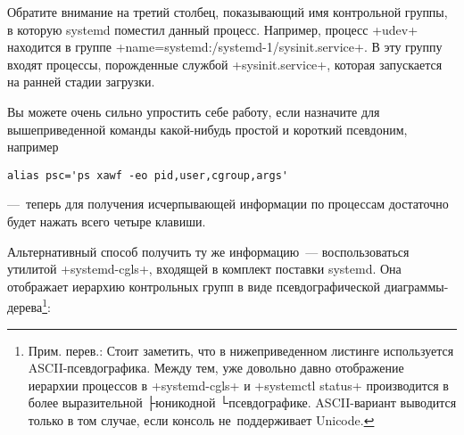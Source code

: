 \documentclass[10pt,oneside,a4paper]{article}
\begin{document}
Обратите внимание на третий столбец, показывающий имя контрольной группы,
в которую systemd поместил данный процесс. Например, процесс +udev+
находится в группе +name=systemd:/systemd-1/sysinit.service+. В эту группу
входят процессы, порожденные службой +sysinit.service+, которая запускается
на ранней стадии загрузки.

Вы можете очень сильно упростить себе работу, если назначите для
вышеприведенной команды какой-нибудь простой и короткий псевдоним, например 
\begin{Verbatim}
alias psc='ps xawf -eo pid,user,cgroup,args'
\end{Verbatim}
---~теперь для получения исчерпывающей информации по процессам достаточно будет
нажать всего четыре клавиши.

Альтернативный способ получить ту же информацию~--- воспользоваться утилитой
+systemd-cgls+, входящей в комплект поставки systemd. Она отображает иерархию
контрольных групп в виде псевдографической диаграммы-дерева\footnote{Прим.
перев.: Стоит заметить, что в нижеприведенном листинге используется
ASCII-псевдографика. Между тем, уже довольно давно отображение иерархии
процессов в +systemd-cgls+ и +systemctl status+ производится в более
выразительной ├юникодной └псевдографике. ASCII-вариант выводится только в том
случае, если консоль не~поддерживает Unicode.}: 
\end{document}
